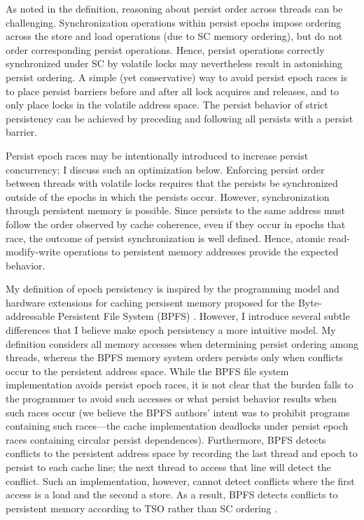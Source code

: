 As noted in the definition, reasoning about persist order across threads can be challenging.
Synchronization operations within persist epochs impose ordering across the store and load operations (due to SC memory ordering), but do not order corresponding persist operations.
Hence, persist operations correctly synchronized under SC by volatile locks may nevertheless result in astonishing persist ordering.
A simple (yet conservative) way to avoid persist epoch races is to place persist barriers before and after all lock acquires and releases, and to only place locks in the volatile address space.
The persist behavior of strict persistency can be achieved by preceding and following all persists with a persist barrier.

Persist epoch races may be intentionally introduced to increase persist concurrency; I discuss such an optimization below.
Enforcing persist order between threads with volatile locks requires that the persists be synchronized outside of the epochs in which the persists occur.
However, synchronization through persistent memory is possible.
Since persists to the same address must follow the order observed by cache coherence, even if they occur in epochs that race, the outcome of persist synchronization is well defined.
Hence, atomic read-modify-write operations to persistent memory addresses provide the expected behavior.

My definition of epoch persistency is inspired by the programming model and hardware extensions for caching persisent memory proposed for the Byte-addressable Persistent File System (BPFS) \cite{Condit09}.
However, I introduce several subtle differences that I believe make epoch persistency a more intuitive model.
My definition considers all memory accesses when determining persist ordering among threads, whereas the BPFS memory system orders persists only when conflicts occur to the persistent address space.
While the BPFS file system implementation avoids persist epoch races, it is not clear that the burden falls to the programmer to avoid such accesses or what persist behavior results when such races occur (we believe the BPFS authors' intent was to prohibit programs containing such races---the cache implementation deadlocks under persist epoch races containing circular persist dependences).  
Furthermore, BPFS detects conflicts to the persistent address space by recording the last thread and epoch to persist to each cache line; the next thread to access that line will detect the conflict.
Such an implementation, however, cannot detect conflicts where the first access is a load and the second a store.
As a result, BPFS detects conflicts to persistent memory according to TSO rather than SC ordering \cite{SPARCv9}.

